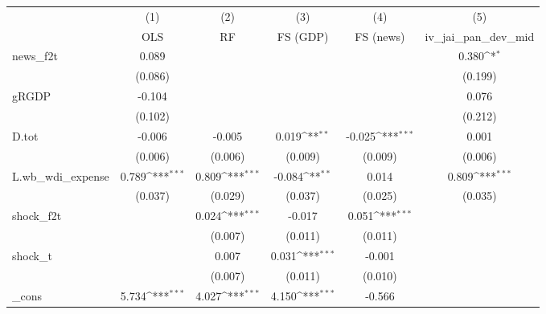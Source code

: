 {
\def\sym#1{\ifmmode^{#1}\else\(^{#1}\)\fi}
\begin{tabular}{l*{5}{c}}
\toprule
            &\multicolumn{1}{c}{(1)}&\multicolumn{1}{c}{(2)}&\multicolumn{1}{c}{(3)}&\multicolumn{1}{c}{(4)}&\multicolumn{1}{c}{(5)}\\
            &\multicolumn{1}{c}{OLS}&\multicolumn{1}{c}{RF}&\multicolumn{1}{c}{FS (GDP)}&\multicolumn{1}{c}{FS (news)}&\multicolumn{1}{c}{iv\_jai\_pan\_dev\_mid}\\
\midrule
news\_f2t    &       0.089         &                     &                     &                     &       0.380\sym{*}  \\
            &     (0.086)         &                     &                     &                     &     (0.199)         \\
\addlinespace
gRGDP       &      -0.104         &                     &                     &                     &       0.076         \\
            &     (0.102)         &                     &                     &                     &     (0.212)         \\
\addlinespace
D.tot       &      -0.006         &      -0.005         &       0.019\sym{**} &      -0.025\sym{***}&       0.001         \\
            &     (0.006)         &     (0.006)         &     (0.009)         &     (0.009)         &     (0.006)         \\
\addlinespace
L.wb\_wdi\_expense&       0.789\sym{***}&       0.809\sym{***}&      -0.084\sym{**} &       0.014         &       0.809\sym{***}\\
            &     (0.037)         &     (0.029)         &     (0.037)         &     (0.025)         &     (0.035)         \\
\addlinespace
shock\_f2t   &                     &       0.024\sym{***}&      -0.017         &       0.051\sym{***}&                     \\
            &                     &     (0.007)         &     (0.011)         &     (0.011)         &                     \\
\addlinespace
shock\_t     &                     &       0.007         &       0.031\sym{***}&      -0.001         &                     \\
            &                     &     (0.007)         &     (0.011)         &     (0.010)         &                     \\
\addlinespace
\_cons      &       5.734\sym{***}&       4.027\sym{***}&       4.150\sym{***}&      -0.566         &                     \\

\end{tabular}}
